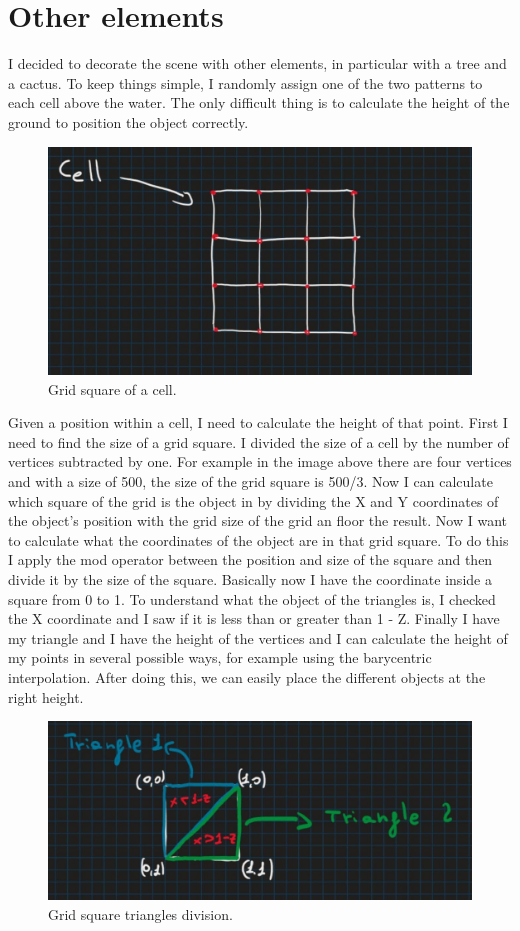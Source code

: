 \section{Other elements}
I decided to decorate the scene with other elements, in particular with a tree and a cactus. To keep things simple, I randomly assign one of the two patterns to each cell above the water. The only difficult thing is to calculate the height of the ground to position the object correctly.

\begin{figure}[hbt!]
	\centering
	\includegraphics[width= 0.75
	\textwidth]{images/object.jpg}
	\caption{Grid square of a cell.}
\end{figure}

\noindent
Given a position within a cell, I need to calculate the height of that point. First I need to find the size of a grid square. I divided the size of a cell by the number of vertices subtracted by one. For example in the image above there are four vertices and with a size of 500, the size of the grid square is 500/3. Now I can calculate which square of the grid is the object in by dividing the X and Y coordinates of the object's position with the grid size of the grid an floor the result. Now I want to calculate what the coordinates of the object are in that grid square. To do this I apply the mod operator between the position and size of the square and then divide it by the size of the square. Basically now I have the coordinate inside a square from 0 to 1. To understand what the object of the triangles is, I checked the X coordinate and I saw if it is less than or greater than 1 - Z. Finally I have my triangle and I have the height of the vertices and I can calculate the height of my points in several possible ways, for example using the barycentric interpolation.
After doing this, we can easily place the different objects at the right height.

\begin{figure}[hbt!]
	\centering
	\includegraphics[width= 1
	\textwidth]{images/object2.jpg}
	\caption{Grid square triangles division.}
\end{figure}

